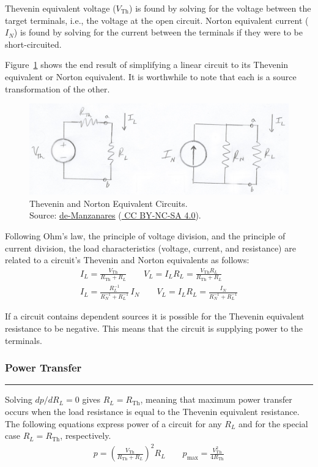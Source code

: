 \documentclass{article}
\newcommand{\mysubsection}[1]{
    \subsubsection*{#1}
    \addcontentsline{toc}{subsection}{#1}
    \vspace{-1em}
    \rule{\linewidth}{.1mm}
    \par
}
\begin{document}
    Thevenin equivalent voltage ($V_\text{Th}$) is found by solving for the voltage between the target terminals, i.e., the voltage at the open circuit.
    Norton equivalent current ($I_N$) is found by solving for the current between the terminals if they were to be short-circuited.

    Figure~\ref{fig:thev-norton-transf} shows the end result of simplifying a linear circuit to its Thevenin equivalent or Norton equivalent.
    It is worthwhile to note that each is a source transformation of the other.

    \begin{figure}[htbp]
        \centering
        \includegraphics[width=.7\textwidth]{theveninNortonTransform}
        \caption{Thevenin and Norton Equivalent Circuits. \\
        Source:
        \href{https://github.com/de-Manzanares}
        {\color{blue}\underline{de-Manzanares}}
        (\href{https://creativecommons.org/licenses/by-nc-sa/4.0/deed.en}{\color{blue} \underline{CC BY-NC-SA 4.0}}).}

        \label{fig:thev-norton-transf}
    \end{figure}

    \smallskip\noindent
    Following Ohm's law, the principle of voltage division, and the principle of current division, the load characteristics (voltage, current, and resistance) are related to a circuit's Thevenin and Norton equivalents as follows:
    \begin{gather*}
        I_L = \frac{V_{\text{Th}}}{R_{\text{Th}}+R_L}
        \qquad
        V_L = I_L R_L = \frac{V_\text{Th}R_L}{R_{\text{Th}}+R_L}    \\[.5em]
        I_L = \frac{R_L^{-1}}{R_N^{-1}+R_L^{-1}}\,I_N
        \qquad
        V_L = I_L R_L = \frac{I_N}{R_N^{-1} + R_L^{-1}}
    \end{gather*}

    \medskip
    \noindent
    If a circuit contains dependent sources it is possible for the Thevenin equivalent resistance to be negative.
    This means that the circuit is supplying power to the terminals.

    \smallskip
    \mysubsection{Power Transfer}
    \smallskip
    \noindent
    Solving $dp/dR_L = 0$ gives $R_L=R_\text{Th}$, meaning that maximum power transfer occurs when the load resistance is equal to the Thevenin equivalent resistance.
    The following equations express power of a circuit for any $R_L$ and for the special case $R_L = R_\text{Th}$, respectively.
    \begin{gather*}
        p=\left( \frac{V_{\text{Th}}}{R_{\text{Th}}+R_L} \right) ^2 R_L \qquad
        p_\text{max} = \frac{V_\text{Th}^2}{4R_\text{Th}}
    \end{gather*}
\end{document}
